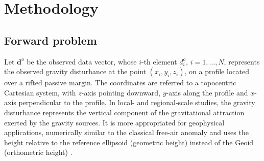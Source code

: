 \documentclass[manuscript]{geophysics}
\begin{document}
\section{Methodology}


\subsection{Forward problem}


Let $\mathbf{d}^{o}$ be the observed data vector, whose $i$-th element $d^{o}_{i}$, 
$i = 1, \dots, N$, represents the observed gravity disturbance \citep{heiskanen-moritz1967} 
at the point $(x_{i}, y_{i}, z_{i})$, on a profile located over a rifted passive margin. 
The coordinates are referred to a topocentric Cartesian system, with $z$-axis pointing
downward, $y$-axis along the profile and $x$-axis perpendicular to the profile. 
In local- and regional-scale studies, the gravity disturbance 
represents the vertical component of the gravitational attraction exerted by the gravity 
sources. It is more appropriated for geophysical applications,
numerically similar to the classical free-air anomaly and uses the height relative to the
reference ellipsoid (geometric height) instead of the Geoid (orthometric height)
\citep{li2001, fairhead2003, hackney-featherstone2003, hinze2005, vajda-etal2006, 
vajda-etal2007}.
\end{document}
